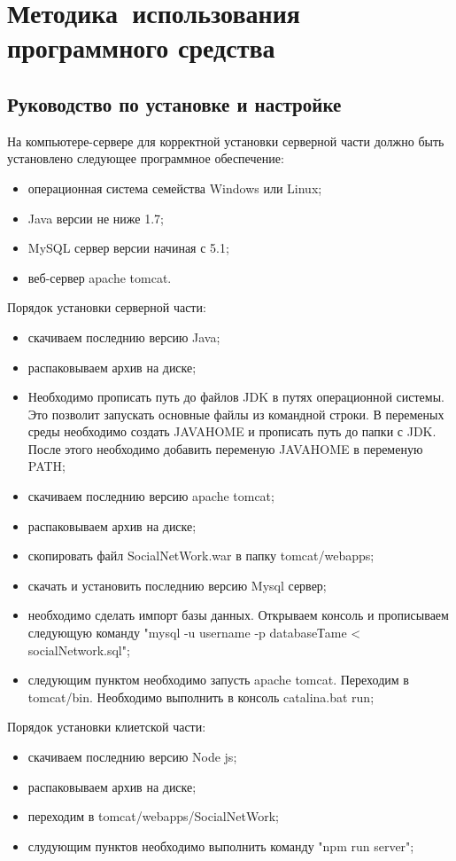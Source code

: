 \section{Методика~использования программного средства}
\label{sec:usage}

\subsection{Руководство по установке и настройке}

На компьютере-сервере для корректной установки серверной части должно быть установлено следующее программное обеспечение:
\begin{itemize}
	\item операционная система семейства Windows или Linux; 
	\item Java версии не ниже 1.7;
	\item MySQL сервер версии начиная с 5.1;
	\item веб-сервер apache tomcat.
\end{itemize}

Порядок установки серверной части:
\begin{itemize}
	\item скачиваем последнию версию Java; 
	\item распаковываем архив на диске;
	\item Необходимо прописать путь до файлов JDK в путях операционной системы. Это позволит запускать основные файлы из командной строки. В переменых среды необходимо создать JAVAHOME и прописать путь до папки с JDK. После этого необходимо добавить переменую JAVAHOME в переменую PATH;
	\item скачиваем последнию версию apache tomcat;
	\item распаковываем архив на диске;
	\item скопировать файл SocialNetWork.war в папку tomcat/webapps;
	\item скачать и установить последнию версию Mysql сервер;
	\item необходимо сделать импорт базы данных. Открываем консоль и прописываем следующую команду "mysql -u username -p databaseТame < socialNetwork.sql";
	\item следующим пунктом необходимо запусть apache tomcat. Переходим в tomcat/bin. Необходимо выполнить в консоль catalina.bat run; 
\end{itemize}

Порядок установки клиетской части:
\begin{itemize}
	\item скачиваем последнию версию Node js; 
	\item распаковываем архив на диске;
	\item переходим в tomcat/webapps/SocialNetWork;
	\item слудующим пунктов необходимо выполнить команду "npm run server";
\end{itemize}

